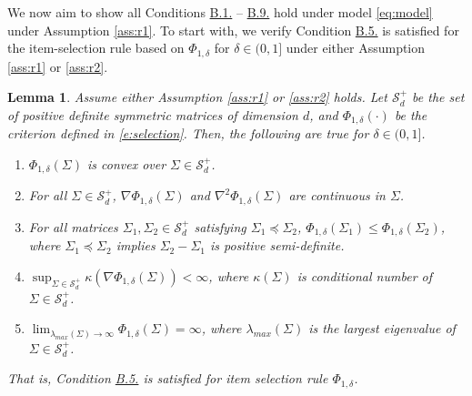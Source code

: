 \documentclass[12pt]{article}
\newtheorem{lemma}[theorem]{Lemma}
\begin{document}
We now aim to show all Conditions \hyperref[c:c1]{B.1.} -- \hyperref[c:c7b]{B.9.} hold under model \eqref{eq:model} under Assumption \ref{ass:r1}. To start with, we verify Condition \hyperref[c:c5]{B.5.} is satisfied for the item-selection rule based on $\Phi_{1,\delta}$ for $\delta \in (0,1]$ under either Assumption \ref{ass:r1} or \ref{ass:r2}. 

\begin{lemma} \label{lemma:lemma1}
Assume either Assumption \ref{ass:r1} or \ref{ass:r2} holds. Let $\mathcal{S}_d^+$ be the set of positive definite symmetric matrices of dimension $d$, and $\Phi_{1,\delta}(\cdot)$ be the criterion defined in \eqref{e:selection}. Then, the following are true for $\delta \in (0,1]$.
\begin{enumerate}
\item{$\Phi_{1,\delta}(\Sigma)$ is convex over $\Sigma \in \mathcal{S}_d^+$.}
\item{For all $\Sigma \in \mathcal{S}_d^+$, $\nabla \Phi_{1,\delta}(\Sigma)$ and $\nabla^2 \Phi_{1,\delta}(\Sigma)$ are continuous in $\Sigma$.}
\item{For all matrices $\Sigma_1, \Sigma_2 \in \mathcal{S}_d^+$ satisfying $\Sigma_1 \preceq \Sigma_2$, $\Phi_{1,\delta}(\Sigma_1) \leq \Phi_{1,\delta}(\Sigma_2)$, where $\Sigma_1 \preceq \Sigma_2$ implies $\Sigma_2 - \Sigma_1$ is positive semi-definite.}
\item{$\sup_{\Sigma \in \mathcal{S}_d^+} \kappa( \nabla \Phi_{1,\delta}(\Sigma)) < \infty$, where $\kappa(\Sigma)$ is conditional number of $\Sigma \in \mathcal{S}_d^+$.}
\item{$\lim_{\lambda_{max}(\Sigma) \to \infty} \Phi_{1,\delta}(\Sigma) = \infty$, where $\lambda_{max}(\Sigma)$ is the largest eigenvalue of $\Sigma \in \mathcal{S}_d^+$.}
\end{enumerate}
That is, Condition \hyperref[c:c5]{B.5.} is satisfied for item selection rule $\Phi_{1,\delta}$.
\end{lemma}
\end{document}
